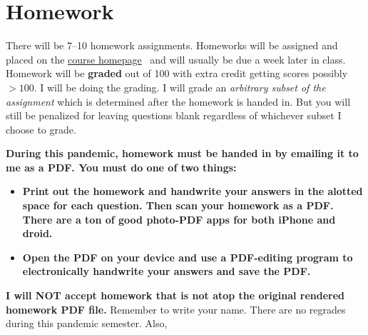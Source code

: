 \documentclass[12pt]{article}
\newcommand{\coursewebpage}{\href{https://github.com/kapelner/QC_Math_621_Fall_2020}{course homepage}}
\begin{document}
\section*{Homework}

There will be 7--10 homework assignments. Homeworks will be assigned and placed on the \coursewebpage~ and will usually be due a week later in class. Homework will be \textbf{graded} out of 100 with extra credit getting scores possibly $> 100$. I will be doing the grading. I will grade an \textit{arbitrary subset of the assignment} which is determined after the homework is handed in. But you will still be penalized for leaving questions blank regardless of whichever subset I choose to grade. 

%

\textbf{During this pandemic, homework must be handed in by emailing it to me as a PDF. You must do one of two things:}

\begin{itemize}
\item \textbf{Print out the homework and handwrite your answers in the alotted space for each question. Then scan your homework as a PDF. There are a ton of good photo-PDF apps for both iPhone and droid. }
\item \textbf{Open the PDF on your device and use a PDF-editing program to electronically handwrite your answers and save the PDF.}
\end{itemize}

\textbf{I will NOT accept homework that is not atop the original rendered homework PDF file.} Remember to write your name. There are no regrades during this pandemic semester. Also,
\end{document}
